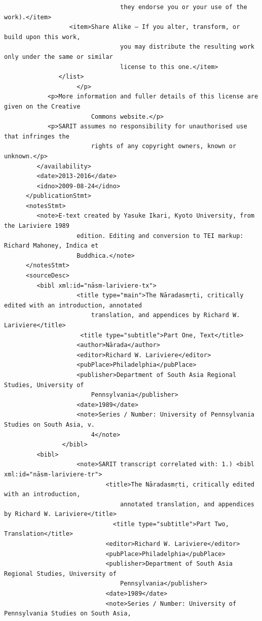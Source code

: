 \documentclass[article,12pt,a4paper]{memoir}%
\begin{document}
\begin{verbatim}
                                they endorse you or your use of the work).</item>
                  <item>Share Alike — If you alter, transform, or build upon this work,
                                you may distribute the resulting work only under the same or similar
                                license to this one.</item>
               </list>
                    </p>
            <p>More information and fuller details of this license are given on the Creative
                        Commons website.</p>
            <p>SARIT assumes no responsibility for unauthorised use that infringes the
                        rights of any copyright owners, known or unknown.</p>
         </availability>
         <date>2013-2016</date>
         <idno>2009-08-24</idno>
      </publicationStmt>
      <notesStmt>
         <note>E-text created by Yasuke Ikari, Kyoto University, from the Lariviere 1989
                    edition. Editing and conversion to TEI markup: Richard Mahoney, Indica et
                    Buddhica.</note>
      </notesStmt>
      <sourceDesc>
         <bibl xml:id="nāsm-lariviere-tx">
                    <title type="main">The Nāradasmṛti, critically edited with an introduction, annotated
                        translation, and appendices by Richard W. Lariviere</title>
			         <title type="subtitle">Part One, Text</title>
                    <author>Nārada</author>
                    <editor>Richard W. Lariviere</editor>
                    <pubPlace>Philadelphia</pubPlace>
                    <publisher>Department of South Asia Regional Studies, University of
                        Pennsylvania</publisher>
                    <date>1989</date>
                    <note>Series / Number: University of Pennsylvania Studies on South Asia, v.
                        4</note>
                </bibl>
         <bibl>
                    <note>SARIT transcript correlated with: 1.) <bibl xml:id="nāsm-lariviere-tr">
                            <title>The Nāradasmṛti, critically edited with an introduction,
                                annotated translation, and appendices by Richard W. Lariviere</title>
				              <title type="subtitle">Part Two, Translation</title>
                            <editor>Richard W. Lariviere</editor>
                            <pubPlace>Philadelphia</pubPlace>
                            <publisher>Department of South Asia Regional Studies, University of
                                Pennsylvania</publisher>
                            <date>1989</date>
                            <note>Series / Number: University of Pennsylvania Studies on South Asia,

\end{verbatim}
\end{document}
